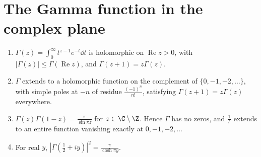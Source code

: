 \section{The Gamma function in the complex plane}\label{sec:gammac}

\begin{theorem}\label{thm:gammac}
\begin{enumerate}[label=(\alph*)]
\item $\Gamma(z)=\int_0^\infty t^{z-1}e^{-t}\dd t$ is holomorphic on $\operatorname{Re}z>0$, with $|\Gamma(z)|\le\Gamma(\operatorname{Re}z)$, and $\Gamma(z+1)=z\Gamma(z)$.
\item $\Gamma$ extends to a holomorphic function on the complement of $\{0,-1,-2,\dots\}$, with simple poles at $-n$ of residue $\frac{(-1)^n}{n!}$, satisfying
$\Gamma(z+1)=z\Gamma(z)$ everywhere.
\item $\Gamma(z)\Gamma(1-z)=\frac\pi{\sin\pi z}$ for $z\in\C\setminus\Z$. Hence $\Gamma$ has no zeros, and $\frac1\Gamma$ extends to an entire function vanishing exactly at
$0,-1,-2,\dots$
\item For real $y$, $|\Gamma(\frac12+iy)|^2=\frac\pi{\cosh\pi y}$.
\end{enumerate}
\end{theorem}

